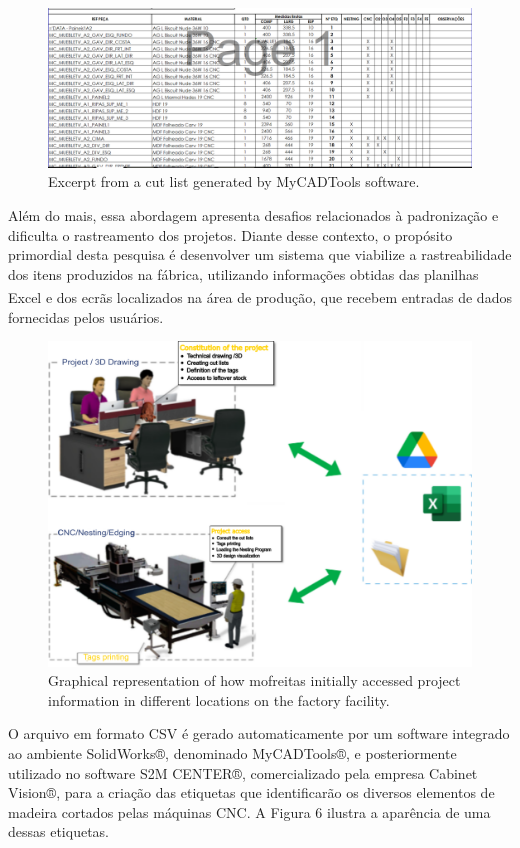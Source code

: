 \begin{figure}[h!]
    \centering
    \includegraphics[width=.65\linewidth]{images/Development/chap4/ListaDeCorte.png}
    \caption{Excerpt from a cut list generated by MyCADTools software.}
    \label{fig:cutLsitMyCad}
\end{figure}


Além do mais, essa abordagem apresenta desafios relacionados à padronização e dificulta o rastreamento dos projetos. Diante desse contexto, o propósito primordial desta pesquisa é desenvolver um sistema que viabilize a rastreabilidade dos itens produzidos na fábrica, utilizando informações obtidas das planilhas Excel \textsuperscript{\textregistered} e dos ecrãs localizados na área de produção, que recebem entradas de dados fornecidas pelos usuários.

\begin{figure}[h!]
    \centering
    \includegraphics[width=.65\linewidth]{images/Development/chap4/MofreitasCase.png}
    \caption{Graphical representation of how mofreitas initially accessed project information in different locations on the factory facility.}
    \label{fig:dataSharing}
\end{figure}
O arquivo em formato CSV é gerado automaticamente por um software integrado ao ambiente SolidWorks®, denominado MyCADTools®, e posteriormente utilizado no software S2M CENTER®, comercializado pela empresa Cabinet Vision®, para a criação das etiquetas que identificarão os diversos elementos de madeira cortados pelas máquinas CNC. A Figura 6 ilustra a aparência de uma dessas etiquetas.

